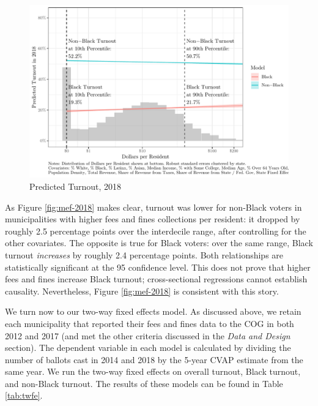 \documentclass[
  12pt,
]{article}
\begin{document}
\begin{figure}[H]

{\centering \includegraphics{draft_paper_files/figure-latex/cross-18-1} 

}

\caption{\label{fig:mef-2018}Predicted Turnout, 2018}\label{fig:cross-18}
\end{figure}

As Figure \ref{fig:mef-2018} makes clear, turnout was lower for non-Black voters in municipalities with higher fees and fines collections per resident: it dropped by roughly 2.5 percentage points over the interdecile range, after controlling for the other covariates. The opposite is true for Black voters: over the same range, Black turnout \emph{increases} by roughly 2.4 percentage points. Both relationships are statistically significant at the 95 confidence level. This does not prove that higher fees and fines increase Black turnout; cross-sectional regressions cannot establish causality. Nevertheless, Figure \ref{fig:mef-2018} is consistent with this story.

We turn now to our two-way fixed effects model. As discussed above, we retain each municipality that reported their fees and fines data to the COG in both 2012 and 2017 (and met the other criteria discussed in the \emph{Data and Design} section). The dependent variable in each model is calculated by dividing the number of ballots cast in 2014 and 2018 by the 5-year CVAP estimate from the same year. We run the two-way fixed effects on overall turnout, Black turnout, and non-Black turnout. The results of these models can be found in Table \ref{tab:twfe}.

\begin{singlespace}

\end{singlespace}
\end{document}
